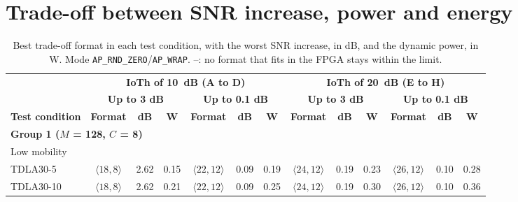 \clearpage
\section{\texorpdfstring{Trade-off between SNR increase, power and energy}{Trade-off between SNR increase, power and energy}}\label{subsec:resultados-compromisso}
\suppressfloats[t]
\begin{table}[htbp]
\caption[Best trade-off format in each test condition, with the worst SNR increase, in dB, and the dynamic power, in W.]{Best trade-off format in each test condition, with the worst SNR increase, in dB, and the dynamic power, in W. Mode \texttt{AP\_RND\_ZERO}/\texttt{AP\_WRAP}. --: no format that fits in the FPGA stays within the limit.}
\label{tab:escolha-condicao}
\vspace{4pt}
\centering
\scriptsize
\renewcommand{\arraystretch}{1.2}
\setlength{\tabcolsep}{2.2pt}
\begin{tabular}{lcccccccccccc}
\toprule
 & \multicolumn{6}{c}{\textbf{IoTh of 10~dB (A to D)}} & \multicolumn{6}{c}{\textbf{IoTh of 20~dB (E to H)}} \\
\cmidrule(lr){2-7}\cmidrule(lr){8-13}
 & \multicolumn{3}{c}{\textbf{Up to 3 dB}} & \multicolumn{3}{c}{\textbf{Up to 0.1 dB}} & \multicolumn{3}{c}{\textbf{Up to 3 dB}} & \multicolumn{3}{c}{\textbf{Up to 0.1 dB}} \\
\cmidrule(lr){2-4}\cmidrule(lr){5-7}\cmidrule(lr){8-10}\cmidrule(lr){11-13}
\textbf{Test condition} & \textbf{Format} & \textbf{dB} & \textbf{W} & \textbf{Format} & \textbf{dB} & \textbf{W} & \textbf{Format} & \textbf{dB} & \textbf{W} & \textbf{Format} & \textbf{dB} & \textbf{W} \\
\midrule
\multicolumn{13}{l}{\textbf{Group 1 ($M$ = 128, $C$ = 8)}} \\
\multicolumn{13}{l}{Low mobility} \\
\quad TDLA30-5 & $\langle 18,8\rangle$ & 2.62 & 0.15 & $\langle 22,12\rangle$ & 0.09 & 0.19 & $\langle 24,12\rangle$ & 0.19 & 0.23 & $\langle 26,12\rangle$ & 0.10 & 0.28 \\
\quad TDLA30-10 & $\langle 18,8\rangle$ & 2.62 & 0.21 & $\langle 22,12\rangle$ & 0.09 & 0.25 & $\langle 24,12\rangle$ & 0.19 & 0.30 & $\langle 26,12\rangle$ & 0.10 & 0.36 \\

\end{tabular}
\end{table}
